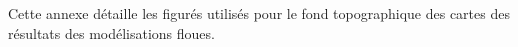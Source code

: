 Cette annexe détaille les figurés utilisés pour le fond topographique
des cartes des résultats des modélisations floues.


\begin{figure}[h]
  \centering
  
\end{figure}


